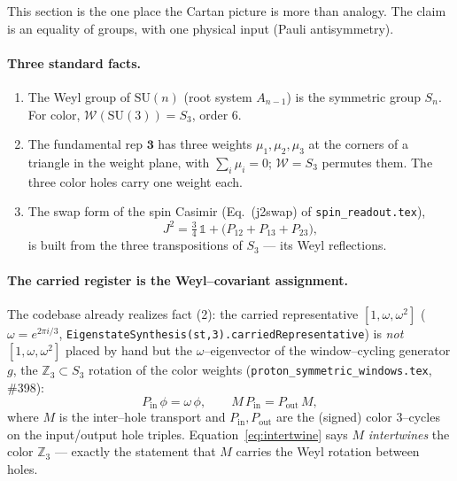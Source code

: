 \documentclass[11pt,oneside]{article}
\newcommand{\Z}{\mathbb{Z}}
\newcommand{\id}{\mathbb{1}}
\newcommand{\code}[1]{\texttt{#1}}
\newcommand{\SU}{\mathrm{SU}}
\newcommand{\Weyl}{\mathcal{W}}
\newcommand{\Pin}{P_{\mathrm{in}}}
\newcommand{\Pout}{P_{\mathrm{out}}}
\theoremstyle{plain}
\begin{document}
This section is the one place the Cartan picture is more than analogy. The claim
is an equality of groups, with one physical input (Pauli antisymmetry).

\paragraph{Three standard facts.}
\begin{enumerate}[leftmargin=2em]
  \item The Weyl group of $\SU(n)$ (root system $A_{n-1}$) is the symmetric group
        $S_n$. For color, $\Weyl(\SU(3))=S_3$, order $6$.
  \item The fundamental rep $\mathbf{3}$ has three weights $\mu_1,\mu_2,\mu_3$ at
        the corners of a triangle in the weight plane, with $\sum_i\mu_i=0$;
        $\Weyl=S_3$ permutes them. The three color holes carry one weight each.
  \item The swap form of the spin Casimir (Eq.~(j2swap) of
        \code{spin\_readout.tex}),
        \begin{equation}
          J^2 = \tfrac34\,\id + \big(P_{12}+P_{13}+P_{23}\big),
          \label{eq:j2swap}
        \end{equation}
        is built from the three transpositions of $S_3$ --- its Weyl reflections.
\end{enumerate}

\paragraph{The carried register is the Weyl--covariant assignment.}
The codebase already realizes fact (2): the carried representative
$[1,\omega,\omega^2]$ ($\omega=e^{2\pi i/3}$,
\code{EigenstateSynthesis(st,3).carriedRepresentative}) is \emph{not}
$[1,\omega,\omega^2]$ placed by hand but the $\omega$--eigenvector of the
window--cycling generator $g$, the $\Z_3\subset S_3$ rotation of the color
weights (\code{proton\_symmetric\_windows.tex}, \#398):
\begin{equation}
  \Pin\,\phi = \omega\,\phi, \qquad
  M\,\Pin = \Pout\,M ,
  \label{eq:intertwine}
\end{equation}
where $M$ is the inter--hole transport and $\Pin,\Pout$ are the (signed) color
$3$--cycles on the input/output hole triples. Equation~\eqref{eq:intertwine} says
$M$ \emph{intertwines} the color $\Z_3$ --- exactly the statement that $M$ carries
the Weyl rotation between holes.
\end{document}
